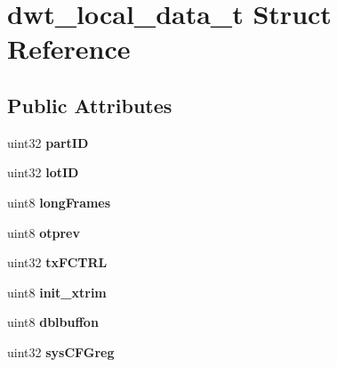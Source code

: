 \hypertarget{structdwt__local__data__t}{\section{dwt\-\_\-local\-\_\-data\-\_\-t Struct Reference}
\label{structdwt__local__data__t}
}
\subsection*{Public Attributes}
\begin{DoxyCompactItemize}
\item 
\hypertarget{structdwt__local__data__t_a909a675193b5fdd7a1367b48fe6d35f1}{uint32 {\bfseries part\-I\-D}}\label{structdwt__local__data__t_a909a675193b5fdd7a1367b48fe6d35f1}

\item 
\hypertarget{structdwt__local__data__t_a710ed61fdddf71afd412400baa3bdd80}{uint32 {\bfseries lot\-I\-D}}\label{structdwt__local__data__t_a710ed61fdddf71afd412400baa3bdd80}

\item 
\hypertarget{structdwt__local__data__t_a5957f556073f450b2d834896d6a3add2}{uint8 {\bfseries long\-Frames}}\label{structdwt__local__data__t_a5957f556073f450b2d834896d6a3add2}

\item 
\hypertarget{structdwt__local__data__t_a6507cd73611daec040a2fba8b1c3a506}{uint8 {\bfseries otprev}}\label{structdwt__local__data__t_a6507cd73611daec040a2fba8b1c3a506}

\item 
\hypertarget{structdwt__local__data__t_a53a286c410d8831a8c4fef8cc1beab8c}{uint32 {\bfseries tx\-F\-C\-T\-R\-L}}\label{structdwt__local__data__t_a53a286c410d8831a8c4fef8cc1beab8c}

\item 
\hypertarget{structdwt__local__data__t_a256c9c7081ecc9c97904b03e4bff1066}{uint8 {\bfseries init\-\_\-xtrim}}\label{structdwt__local__data__t_a256c9c7081ecc9c97904b03e4bff1066}

\item 
\hypertarget{structdwt__local__data__t_a1e75c79950353e0b135266fa9a720c4c}{uint8 {\bfseries dblbuffon}}\label{structdwt__local__data__t_a1e75c79950353e0b135266fa9a720c4c}

\item 
\hypertarget{structdwt__local__data__t_afa5f7e8eef848d82d82d0ada0847f665}{uint32 {\bfseries sys\-C\-F\-Greg}}\label{structdwt__local__data__t_afa5f7e8eef848d82d82d0ada0847f665}


\end{DoxyCompactItemize}
